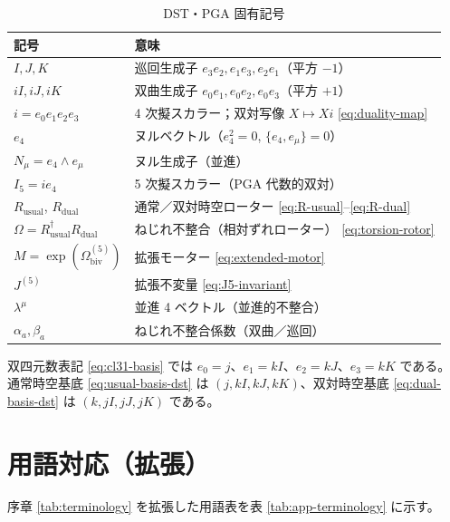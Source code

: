\documentclass[dvipdfmx,a4paper,oneside]{jsbook}
\numberwithin{equation}{chapter}
\begin{document}
\begin{table}[htbp]
  \centering
  \caption{DST・PGA 固有記号}
  \label{tab:app-dst-symbols}
  \begin{tabular}{@{}ll@{}}
    \toprule
    記号 & 意味 \\
    \midrule
    \(I, J, K\) & 巡回生成子 \(e_3e_2, e_1e_3, e_2e_1\)（平方 \(-1\)） \\
    \(iI, iJ, iK\) & 双曲生成子 \(e_0e_1, e_0e_2, e_0e_3\)（平方 \(+1\)） \\
    \(i = e_0e_1e_2e_3\) & 4 次擬スカラー；双対写像 \(X \mapsto Xi\) \eqref{eq:duality-map} \\
    \(e_4\) & ヌルベクトル（\(e_4^2=0\), \(\{e_4,e_\mu\}=0\)） \\
    \(N_\mu = e_4 \wedge e_\mu\) & ヌル生成子（並進） \\
    \(I_5 = ie_4\) & 5 次擬スカラー（PGA 代数的双対） \\
    \(R_{\mathrm{usual}}\), \(R_{\mathrm{dual}}\) & 通常／双対時空ローター \eqref{eq:R-usual}–\eqref{eq:R-dual} \\
    \(\Omega = R_{\mathrm{usual}}^\dagger R_{\mathrm{dual}}\) & ねじれ不整合（相対ずれローター） \eqref{eq:torsion-rotor} \\
    \(M = \exp(\Omega_{\mathrm{biv}}^{(5)})\) & 拡張モーター \eqref{eq:extended-motor} \\
    \(J^{(5)}\) & 拡張不変量 \eqref{eq:J5-invariant} \\
    \(\lambda^\mu\) & 並進 4 ベクトル（並進的不整合） \\
    \(\alpha_a, \beta_a\) & ねじれ不整合係数（双曲／巡回） \\
    \bottomrule
  \end{tabular}
\end{table}

双四元数表記 \eqref{eq:cl31-basis} では \(e_0 = j\)、\(e_1 = kI\)、\(e_2 = kJ\)、\(e_3 = kK\) である。
通常時空基底 \eqref{eq:usual-basis-dst} は \((j, kI, kJ, kK)\)、双対時空基底 \eqref{eq:dual-basis-dst} は \((k, jI, jJ, jK)\) である。

\section{用語対応（拡張）}

序章 \ref{tab:terminology} を拡張した用語表を表 \ref{tab:app-terminology} に示す。
\end{document}
